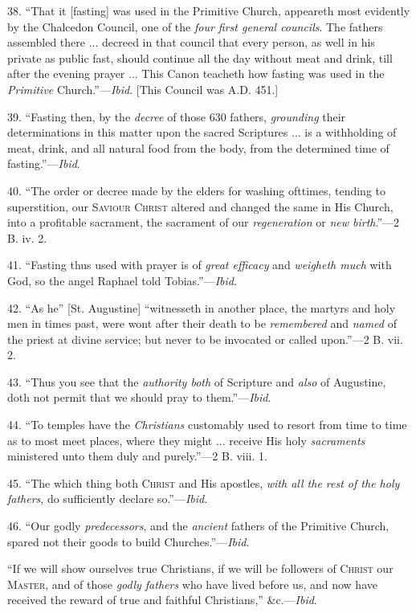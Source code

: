 38. ``That it [fasting] was used in the Primitive Church,
appeareth most evidently by the Chalcedon Council, one of the \emph{four
first general councils}. The fathers assembled there ... decreed in
that council that every person, as well in his private as public fast,
should continue all the day without meat and drink, till after the
evening prayer ... This Canon teacheth how fasting was used in the \emph{Primitive}
Church.''—\emph{Ibid}. [This Council was A.D. 451.]

39. ``Fasting then, by the \emph{decree} of those 630 fathers, \emph{grounding}
their determinations in this matter upon the sacred Scriptures ... is
a withholding of meat, drink, and all natural food from the body, from
the determined time of fasting.''—\emph{Ibid}.

40. ``The order or decree made by the elders for washing
ofttimes, tending to superstition, our S\textsc{aviour} C\textsc{hrist}
altered and changed the same in His Church, into a profitable
sacrament, the sacrament of our \emph{regeneration} or \emph{new birth}.''—2
B. iv. 2.

41. ``Fasting thus used with prayer is of \emph{great efficacy}
and \emph{weigheth much} with God, so the angel Raphael told
Tobias.''—\emph{Ibid}.

42. ``As he'' [St. Augustine] ``witnesseth in another
place, the martyrs and holy men in times past, were wont after their
death to be \emph{remembered} and \emph{named} of the priest at divine
service; but never to be invocated or called upon.''—2 B. vii.
2.

43. ``Thus you see that the \emph{authority both} of Scripture
and \emph{also} of Augustine, doth not permit that we should pray to
them.''—\emph{Ibid}.

44. ``To temples have the \emph{Christians} customably used to
resort from time to time as to most meet places, where they might ...
receive His holy \emph{sacraments} ministered unto them duly and
purely.''—2 B. viii. 1.

45. ``The which thing both C\textsc{hrist} and His
apostles, \emph{with all the rest of the holy fathers}, do
sufficiently declare so.''—\emph{Ibid}.

46. ``Our godly \emph{predecessors}, and the \emph{ancient}
fathers of the Primitive Church, spared not their goods to build
Churches.''—\emph{Ibid}.

``If we will show ourselves true Christians, if we will be
followers of C\textsc{hrist} our M\textsc{aster},
and of those \emph{godly fathers} who have lived before us, and now
have received the reward of true and faithful Christians,''
\&c.—\emph{Ibid}.

